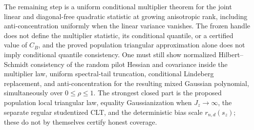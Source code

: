 The remaining step is a uniform conditional multiplier theorem for the joint linear and diagonal-free quadratic statistic at growing anisotropic rank, including anti-concentration uniformly when the linear variance vanishes.  The frozen handle does not define the multiplier statistic, its conditional quantile, or a certified value of \(C_B\), and the proved population triangular approximation alone does not imply conditional quantile consistency.  One must still show normalized Hilbert--Schmidt consistency of the random pilot Hessian and covariance inside the multiplier law, uniform spectral-tail truncation, conditional Lindeberg replacement, and anti-concentration for the resulting mixed Gaussian polynomial, simultaneously over \(0\le\rho\le1\).  The strongest closed part is the proposed population local triangular law, equality Gaussianization when \(J_z\to\infty\), the separate regular studentized CLT, and the deterministic bias scale \(r_{n,d}(s_z)\); these do not by themselves certify honest coverage.